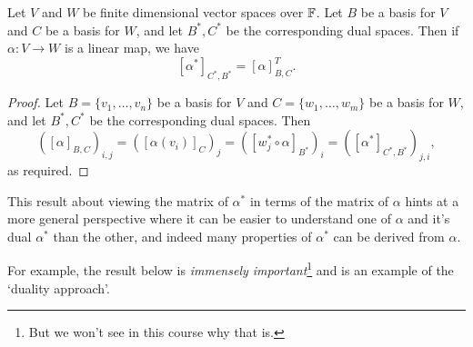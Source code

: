 \documentclass[a4paper]{scrartcl}
\begin{document}
\begin{theorem}
    Let $V$ and $W$ be finite dimensional vector spaces over $\mathbb{F}$. Let $B$ be a basis for $V$ and $C$ be a basis for $W$, and let $B^*, C^*$ be the corresponding dual spaces.
    Then if $\alpha: V \rightarrow W$ is a linear map, we have
    $$
    [\alpha^*]_{C^*, B^*} = [\alpha]_{B, C}^T.
    $$
\end{theorem}
\begin{proof}
    Let $B = \{v_1, \dots, v_n\}$ be a basis for $V$ and $C = \{w_1, \dots, w_m\}$ be a basis for $W$, and let $B^*, C^*$ be the corresponding dual spaces. Then 
    $$
    ([\alpha]_{B, C})_{i, j} = ([\alpha(v_i)]_{C})_j = ([w_j^* \circ \alpha]_{B^*})_i = ([\alpha^*]_{C^*, B^*})_{j, i},
    $$
    as required.
\end{proof}

This result about viewing the matrix of $\alpha^*$ in terms of the matrix of $\alpha$ hints at a more general perspective where it can be easier to understand one of $\alpha$ and it's dual $\alpha^*$ than the other, and indeed many properties of $\alpha^*$ can be derived from $\alpha$. 

For example, the result below is \emph{immensely important}\footnote{But we won't see in this course why that is.} and is an example of the `duality approach'. 
\end{document}
